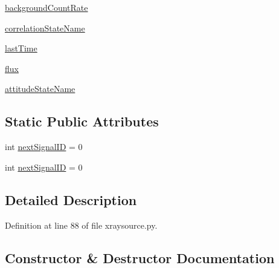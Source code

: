 \begin{DoxyCompactItemize}
\item 
\hyperlink{classmodest_1_1signals_1_1xraysource_1_1PeriodicXRaySource_a3a04d3f0609b7454efc4ef9cdcd7b219}{background\+Count\+Rate}
\item 
\hyperlink{classmodest_1_1signals_1_1poissonsource_1_1DynamicPoissonSource_ac7f62303bb8a417a1ddefb032c707bcd}{correlation\+State\+Name}
\item 
\hyperlink{classmodest_1_1signals_1_1poissonsource_1_1PoissonSource_a34395fc83bd8743a0a5ee69f9392a606}{last\+Time}
\item 
\hyperlink{classmodest_1_1signals_1_1poissonsource_1_1PoissonSource_a6f2c657ad936b921715d826ac74f7fe5}{flux}
\item 
\hyperlink{classmodest_1_1signals_1_1pointsource_1_1PointSource_a0924a2233bb4fd23e50d024e4f1b048e}{attitude\+State\+Name}
\end{DoxyCompactItemize}
\subsection*{Static Public Attributes}
\begin{DoxyCompactItemize}
\item 
int \hyperlink{classmodest_1_1signals_1_1signalsource_1_1SignalSource_a453eafb550b551adbec0903deb63dfce}{next\+Signal\+ID} = 0
\item 
int \hyperlink{classmodest_1_1signals_1_1signalsource_1_1SignalSource_a453eafb550b551adbec0903deb63dfce}{next\+Signal\+ID} = 0
\end{DoxyCompactItemize}


\subsection{Detailed Description}


Definition at line 88 of file xraysource.\+py.



\subsection{Constructor \& Destructor Documentation}
